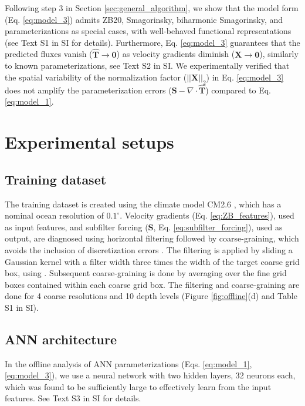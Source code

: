 \documentclass[draft]{agujournal2019}
\begin{document}
Following step 3 in Section \ref{sec:general_algorithm}, we show that the model form (Eq. \eqref{eq:model_3}) admits ZB20, Smagorinsky, biharmonic Smagorinsky, and  parameterizations as special cases, with well-behaved functional representations (see Text S1 in SI for details). Furthermore, Eq. \eqref{eq:model_3} guarantees that the predicted fluxes vanish ($\widehat{\mathbf{T}}\to\mathbf{0}$) as velocity gradients diminish ($\mathbf{X}\to\mathbf{0}$), similarly to known parameterizations, see Text S2 in SI. We experimentally verified that the spatial variability of the normalization factor ($||\mathbf{X}||_2$) in Eq. \eqref{eq:model_3} does not amplify the parameterization errors ($\mathbf{S}-\nabla \cdot \widehat{\mathbf{T}}$) compared to Eq. \eqref{eq:model_1}.



\section{Experimental setups}

\subsection{Training dataset}
The training dataset is created using the climate model CM2.6 \cite{griffies2015impacts}, which has a nominal ocean resolution of $0.1^\circ$.
Velocity gradients (Eq. \eqref{eq:ZB_features}), used as input features, and subfilter forcing ($\mathbf{S}$, Eq. \eqref{eq:subfilter_forcing}), used as output, are diagnosed using horizontal filtering followed by coarse-graining, which avoids the inclusion of discretization errors \cite{guillaumin2021stochastic,christensen2022parametrization,agdestein2025discretize}.
The filtering is applied by sliding a Gaussian kernel with a filter width three times the width of the target coarse grid box, using . Subsequent coarse-graining is done by averaging over the fine grid boxes contained within each coarse grid box. 
The filtering and coarse-graining are done for 4 coarse resolutions and 10 depth levels (Figure \ref{fig:offline}(d) and Table S1 in SI). 

\subsection{ANN architecture}
In the offline analysis of ANN parameterizations (Eqs. \eqref{eq:model_1}, \eqref{eq:model_3}), we use a neural network with two hidden layers, 32 neurons each, which was found to be sufficiently large to effectively learn from the input features. See Text S3 in SI for details. 
\end{document}
